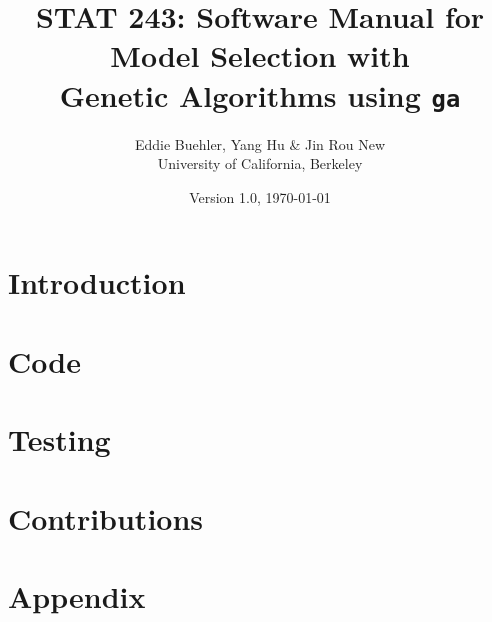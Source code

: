 \documentclass[11pt]{article}
\title{STAT 243: Software Manual for Model Selection with\\ 
	Genetic Algorithms using \texttt{ga}}
\author{Eddie Buehler, Yang Hu \& Jin Rou New\\
	University of California, Berkeley}
\date{Version 1.0, \today}
\begin{document}
\maketitle

\section{Introduction} 

\section{Code}

\section{Testing} 

\section{Contributions} 

\section{Appendix}

\end{document}
